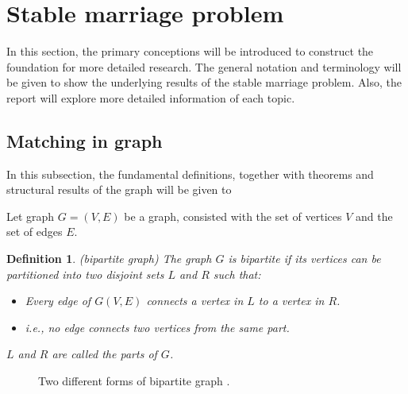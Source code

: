 \documentclass[14pt]{extarticle}
\newtheorem{definition}{Definition}
\begin{document}
\section{Stable marriage problem} \label{SMPintro}

In this section, the primary conceptions will be introduced to construct the foundation for more detailed research. 
The general notation and terminology will be given to show the underlying results of the stable marriage problem. 
Also, the report will explore more detailed information of each topic.

\subsection{Matching in graph}

In this subsection, the fundamental definitions, together with theorems and structural results of the graph will be given to 

Let graph $G=(V,E)$ be a graph, consisted with the set of vertices $V$ and the set of edges $E$. 
\begin{definition}
  (bipartite graph) 
  The graph $G$ is bipartite if its vertices can be partitioned into two disjoint sets $L$ and $R$ such that:
  \begin{itemize}
    \item Every edge of $G(V,E)$ connects a vertex in $L$ to a vertex in $R$.
    \item i.e., no edge connects two vertices from the same part.
  \end{itemize}
  $L$ and $R$ are called the {\it parts} of $G$.
\end{definition}

\begin{figure}[H]
  \centering
  \quad
  \caption{Two different forms of bipartite graph \cite{coursera}.}
\end{figure}
\end{document}
